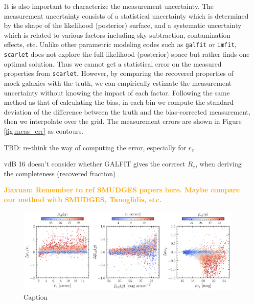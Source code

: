 \documentclass[twocolumn,astrosymb,twocolappendix]{aastex631}
\newcommand{\jiaxuan}[1]{\textcolor{orange}{\textbf{Jiaxuan: #1}}}
\newcommand{\code}[1]{\texttt{#1}}
\begin{document}
\begin{CJK*}{UTF8}{gbsn}
It is also important to characterize the measurement uncertainty. The measurement uncertainty consists of a statistical uncertainty which is determined by the shape of the likelihood (posterior) surface, and a systematic uncertainty which is related to various factors including sky subtraction, contamination effects, etc. Unlike other parametric modeling codes such as \code{galfit} or \code{imfit}, \code{scarlet} does not explore the full likelihood (posterior) space but rather finds one optimal solution. Thus we cannot get a statistical error on the measured properties from \code{scarlet}. However, by comparing the recovered properties of mock galaxies with the truth, we can empirically estimate the measurement uncertainty without knowing the impact of each factor. Following the same method as that of calculating the bias, in each bin we compute the standard deviation of the difference between the truth and the bias-corrected measurement, then we interpolate over the grid. The measurement errors are shown in Figure \ref{fig:meas_err} as contours. 



TBD: re-think the way of computing the error, especially for $r_e$. 


vdB 16 doesn't consider whether GALFIT gives the corrrect $R_e$, when deriving the completeness (recovered fraction)

\jiaxuan{Remember to ref SMUDGES papers here. Maybe compare our method with SMUDGES, Tanoglidis, etc.}

\begin{figure}
	\vbox{ 
		\centering
		\includegraphics[width=1\linewidth]{meas_bias.pdf}
	}
    \caption{Caption}
    \label{fig:meas_bias}
\end{figure}



\end{CJK*}
\end{document}
